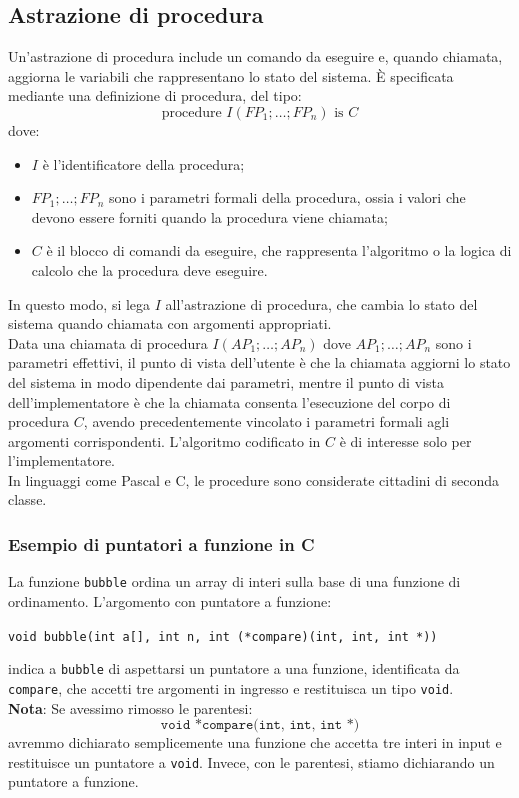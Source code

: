 \documentclass{article}
\begin{document}
	\subsection{Astrazione di procedura}
	Un'astrazione di procedura include un comando da eseguire e, quando chiamata, aggiorna le variabili che rappresentano lo stato del sistema. È specificata mediante una definizione di procedura, del tipo:
	\[
		\text{{procedure }} I(FP_1; \ldots; FP_n) \text{{ is }} C
	\]
	dove:
	\begin{itemize}
		\item \(I\) è l'identificatore della procedura;
		\item \(FP_1; \ldots; FP_n\) sono i parametri formali della procedura, ossia i valori che devono essere forniti quando la procedura viene chiamata;
		\item \(C\) è il blocco di comandi da eseguire, che rappresenta l'algoritmo o la logica di calcolo che la procedura deve eseguire.
	\end{itemize}
	In questo modo, si lega \(I\) all'astrazione di procedura, che cambia lo stato del sistema quando chiamata con argomenti appropriati.
	\vspace{\baselineskip} \\
	Data una chiamata di procedura \(I(AP_1; \ldots; AP_n)\) dove \(AP_1; \ldots; AP_n\) sono i parametri effettivi, il punto di vista dell'utente è che la chiamata aggiorni lo stato del sistema in modo dipendente dai parametri, mentre il punto di vista dell'implementatore è che la chiamata consenta l'esecuzione del corpo di procedura \(C\), avendo precedentemente vincolato i parametri formali agli argomenti corrispondenti. L'algoritmo codificato in \(C\) è di interesse solo per l'implementatore.\\
	In linguaggi come Pascal e C, le procedure sono considerate cittadini di seconda classe.

	\subsubsection*{Esempio di puntatori a funzione in C}
	La funzione \texttt{bubble} ordina un array di interi sulla base di una funzione di ordinamento. L'argomento con puntatore a funzione:
	\begin{center}
		\texttt{void bubble(int a[], int n, int (*compare)(int, int, int *))}
	\end{center}
	indica a \texttt{bubble} di aspettarsi un puntatore a una funzione, identificata da \texttt{compare}, che accetti tre argomenti in ingresso e restituisca un tipo \texttt{void}.
	\vspace{\baselineskip} \\
	\textbf{Nota}: Se avessimo rimosso le parentesi:
	\[
	\texttt{void *compare(int, int, int *)}
	\]
	avremmo dichiarato semplicemente una funzione che accetta tre interi in input e restituisce un puntatore a \texttt{void}. Invece, con le parentesi, stiamo dichiarando un puntatore a funzione.
\end{document}
